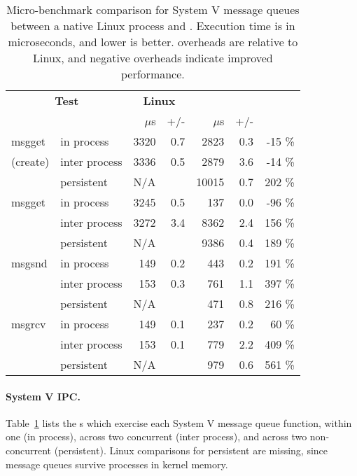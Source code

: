 \begin{table}[t!b!]
\footnotesize
\centering
\begin{tabular}{|ll|rr|rrr|}
\hline
\multicolumn{2}{|c|}{{\bf Test}} &
\multicolumn{2}{|c|}{{\bf Linux}} &
\multicolumn{3}{|c|}{{\bf \sysname{}}} \\
 & & $\mu$s & +/- & $\mu$s & +/- & \\
\hline
msgget & in process	&	3320	& 0.7 &	2823	& 0.3 &	-15	\%	\\
(create) & inter process	&	3336	& 0.5 &	2879	& 3.6 &	-14	\%	\\
            & persistent	&	N/A	& &	10015	& 0.7 &	202	\%	\\
\hline								
msgget & in process	&	3245	& 0.5 &	137	& 0.0 &	-96	\%	\\
            & inter process	&	3272	& 3.4 &	8362	& 2.4 &	156	\%	\\
            & persistent	&	N/A	& &	9386	& 0.4 &	189	\%	\\
\hline								
msgsnd & in process	&	149	& 0.2 &	443	& 0.2 &	191	\%	\\
             & inter process	&	153	& 0.3 &	761	& 1.1 &	397	\%	\\
             & persistent	&	N/A	& &	471	& 0.8 &	216	\%	\\
\hline								
msgrcv & in process	&	149	& 0.1 &	237	& 0.2 &	60	\%	\\
            & inter process	&	153	& 0.1 &	779	& 2.2 &	409	\%	\\
            & persistent	&	N/A	& &	979	& 0.6 &	561	\%	\\\hline
\end{tabular}
\caption[The \microbench{} results for System V message queues in Linux, KVM, and \sysname{}]
{Micro-benchmark comparison for System V message queues
between a native Linux process and \sysname{} \picoprocs{}.
Execution time is in microseconds, and lower is better.
overheads are relative to Linux, and negative overheads indicate improved performance.}
\label{tab:graphene:msgq}
\end{table}

\paragraph{System V IPC.}
Table~\ref{tab:graphene:msgq} lists the \microbench{}s
which exercise each System V message queue function,
within one \picoproc{} (in process), across two concurrent \picoprocs{} (inter process),
and across two non-concurrent \picoprocs{} (persistent).
Linux comparisons for persistent are missing, since message queues 
survive processes in kernel memory.

